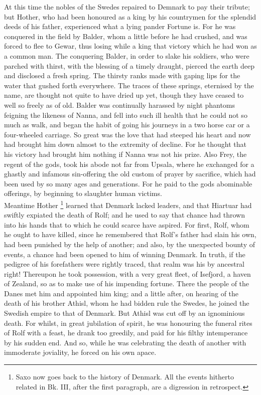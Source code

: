 \documentclass[10pt,a4paper]{report}
\begin{document}
At this time the nobles of the Swedes repaired to Demnark to pay their tribute; but Hother, who had been honoured as a king by his countrymen for the splendid deeds of his father, experienced what a lying pander Fortune is. For he was conquered in the field by Balder, whom a little before he had crushed, and was forced to flee to Gewar, thus losing while a king that victory which he had won as a common man. The conquering Balder, in order to slake his soldiers, who were parched with thirst, with the blessing of a timely draught, pierced the earth deep and disclosed a fresh spring. The thirsty ranks made with gaping lips for the water that gushed forth everywhere. The traces of these springs, eternised by the name, are thought not quite to have dried up yet, though they have ceased to well so freely as of old. Balder was continually harassed by night phantoms feigning the likeness of Nanna, and fell into such ill health that he could not so much as walk, and began the habit of going his journeys in a two horse car or a four-wheeled carriage. So great was the love that had steeped his heart and now had brought him down almost to the extremity of decline. For he thought that his victory had brought him nothing if Nanna was not his prize. Also Frey, the regent of the gods, took his abode not far from Upsala, where he exchanged for a ghastly and infamous sin-offering the old custom of prayer by sacrifice, which had been used by so many ages and generations. For he paid to the gods abominable offerings, by beginning to slaughter human victims.\\

Meantime Hother \footnote{Saxo now goes back to the history of Denmark.  All the events hitherto related in Bk. III, after the first paragraph, are a digression in retrospect.} learned that Denmark lacked leaders, and that Hiartuar had swiftly expiated the death of Rolf; and he used to say that chance had thrown into his hands that to which he could scarce have aspired. For first, Rolf, whom he ought to have killed, since he remembered that Rolf's father had slain his own, had been punished by the help of another; and also, by the unexpected bounty of events, a chance had been opened to him of winning Denmark. In truth, if the pedigree of his forefathers were rightly traced, that realm was his by ancestral right! Thereupon he took possession, with a very great fleet, of Isefjord, a haven of Zealand, so as to make use of his impending fortune. There the people of the Danes met him and appointed him king; and a little after, on hearing of the death of his brother Athisl, whom he had bidden rule the Swedes, he joined the Swedish empire to that of Denmark. But Athisl was cut off by an ignominious death. For whilst, in great jubilation of spirit, he was honouring the funeral rites of Rolf with a feast, he drank too greedily, and paid for his filthy intemperance by his sudden end. And so, while he was celebrating the death of another with immoderate joviality, he forced on his own apace.\\
\end{document}
